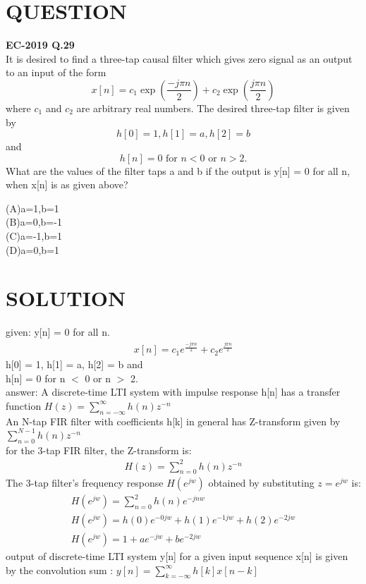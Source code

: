 \documentclass[journal,12pt,twocolumn]{IEEEtran}
\begin{document}
\section*{QUESTION}
\begin{large}
\textbf{EC-2019 Q.29}\\
It is desired to find a three-tap causal filter which gives zero signal as an output to an input of the form
\[x[n]  = c_1 \exp{(\frac{-j\pi n}{2})} +c_2 \exp{(\frac{j\pi n}{2})}\]
where $c_1$ and $c_2$ are arbitrary real numbers. The desired three-tap filter is given by
\[h[0]=1, h[1]=a ,h[2]=b\]
and
\[h[n]=0 \text{ for } n<0 \text{ or } n>2.\]
What are the values of the filter taps a and b if the output is y[n] = 0 for all n, when x[n] is as given above?\\
\begin{center}
\end{center}
(A)a=1,b=1\\
(B)a=0,b=-1\\
(C)a=-1,b=1\\
(D)a=0,b=1\\


\section*{SOLUTION}

given:
y[n] = 0 for all n.
\begin{align}
x[n]  = c_1 e^{\frac{-j\pi n}{2}} +c_2 e^{\frac{j\pi n}{2}}
\end{align}
h[0] = 1, h[1] = a, h[2] = b and\\
h[n] = 0 for n $<$ 0 or n $>$ 2.\\
answer:
A discrete-time LTI system with impulse response h[n] has a transfer function $ H(z)=\sum_{n=-\infty}^{\infty}h(n)z^{-n} $\\
An N-tap FIR filter with coefficients h[k] in general has Z-transform  given by $ \sum_{n=0}^{N-1}h(n)z^{-n}  $\\

for the 3-tap FIR filter, the  Z-transform is:
\begin{align}
    H(z)= \sum_{n=0}^{2}h(n)z^{-n} 
\end{align}
The 3-tap filter's frequency response $H(e^{jw})$ obtained by substituting $z=e^{jw}$ is:
\begin{align}
    H(e^{jw})= \sum_{n=0}^{2}h(n)e^{-jnw}\\
    H(e^{jw})=h(0)e^{-0jw}+h(1)e^{-1jw}+h(2)e^{-2jw}\\
    H(e^{jw})=1+ae^{-jw}+be^{-2jw}
\end{align}  
output of discrete-time LTI system y[n] for a given input sequence x[n] is given by the convolution sum :
$y[n]=\sum_{k=-\infty}^{\infty}h[k]x[n-k]$\\



\end{large}
\end{document}

